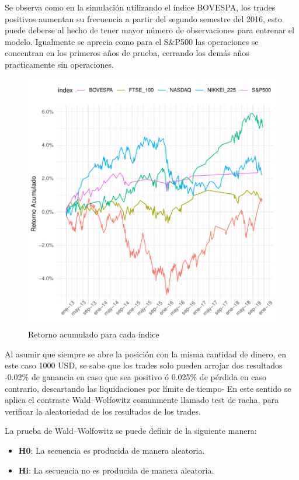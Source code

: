 \documentclass[a4paper,12pt]{Latex/Classes/PhDthesisPSnPDF}
\begin{document}
Se observa como en la simulación utilizando el índice BOVESPA, los trades positivos aumentan su frecuencia a partir del segundo semestre del 2016, esto puede deberse al hecho de tener mayor número de observaciones para entrenar el modelo. Igualmente se aprecia como para el S\&P500 las operaciones se concentran en los primeros años de prueba, cerrando los demás años practicamente sin operaciones.


\begin{figure}[H]
\centering
\includegraphics{main-024}
\caption{Retorno acumulado para cada índice}
\end{figure}

Al asumir que siempre se abre la posición con la misma cantidad de dinero, en este caso 1000 USD, se sabe que los trades solo pueden arrojar dos resultados -0.02\% de ganancia en caso que sea positivo ó 0.025\% de pérdida en caso contrario, descartando las liquidaciones por límite de tiempo- En este sentido se aplica el contraste Wald–Wolfowitz comunmente llamado test de racha, para verificar la aleatoriedad de los resultados de los trades.

La prueba de Wald–Wolfowitz se puede definir de la siguiente manera:

\begin{itemize}
\item \textbf{H0}: La secuencia es producida de manera aleatoria.
\item \textbf{Hi}: La secuencia no es producida de manera aleatoria.
\end{itemize}
\end{document}
